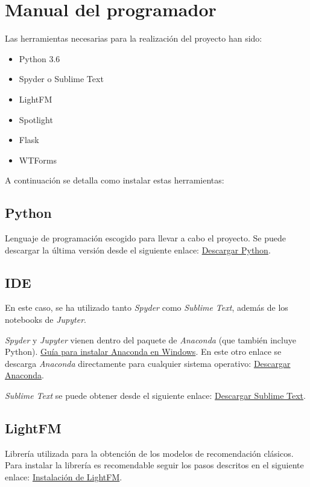 \section{Manual del programador}
Las herramientas necesarias para la realización del proyecto han sido:
\begin{itemize}
\tightlist
\item Python 3.6
\item Spyder o Sublime Text
\item LightFM
\item Spotlight
\item Flask
\item WTForms
\end{itemize}
A continuación se detalla como instalar estas herramientas:

\subsection{Python}
Lenguaje de programación escogido para llevar a cabo el proyecto. Se puede descargar la última versión desde el siguiente enlace: \href{https://www.python.org/downloads/}{Descargar Python}.

\subsection{IDE}
En este caso, se ha utilizado tanto \textit{Spyder} como \textit{Sublime Text}, además de los notebooks de \textit{Jupyter}.

\textit{Spyder} y \textit{Jupyter} vienen dentro del paquete de \textit{Anaconda} (que también incluye Python). \href{https://www.datacamp.com/community/tutorials/installing-anaconda-windows}{Guía para instalar Anaconda en Windows}. En este otro enlace se descarga \textit{Anaconda} directamente para cualquier sistema operativo: \href{https://www.anaconda.com/distribution/}{Descargar Anaconda}.

\textit{Sublime Text} se puede obtener desde el siguiente enlace: \href{https://www.sublimetext.com/3}{Descargar Sublime Text}.

\subsection{LightFM}
Librería utilizada para la obtención de los modelos de recomendación clásicos. Para instalar la librería es recomendable seguir los pasos descritos en el siguiente enlace: \href{http://lyst.github.io/lightfm/docs/home.html#installation}{Instalación de LightFM}.

